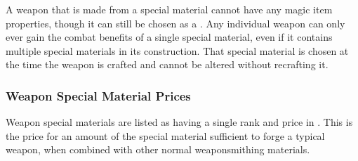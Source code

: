     A weapon that is made from a special material cannot have any magic item properties, though it can still be chosen as a .
    Any individual weapon can only ever gain the combat benefits of a single special material, even if it contains multiple special materials in its construction.
    That special material is chosen at the time the weapon is crafted and cannot be altered without recrafting it.

    \subsubsection{Weapon Special Material Prices}
      Weapon special materials are listed as having a single rank and price in .
      This is the price for an amount of the special material sufficient to forge a typical weapon, when combined with other normal weaponsmithing materials.

